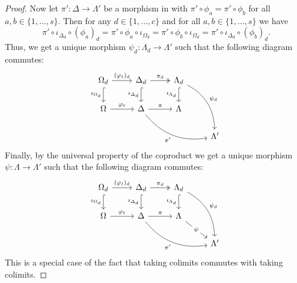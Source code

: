 \begin{proof}
Now let $\pi'\colon \Delta \to \Lambda'$ be a morphism in \SkeletalGSets{} with $\pi' \circ \phi_a = \pi' \circ \phi_b$ for all $a,b \in \{1,\dots,s\}$. Then for any $d \in \{1,\dots,c\}$ and for all $a,b \in \{1,\dots,s\}$ we have \[\pi' \circ \iota_{\Delta_d} \circ (\phi_a)_d = \pi' \circ \phi_a \circ \iota_{\Omega_d} = \pi' \circ \phi_b \circ \iota_{\Omega_d} = \pi' \circ \iota_{\Delta_d} \circ (\phi_b)_d.\] Thus, we get a unique morphism $\psi_d \colon \Lambda_d \to \Lambda'$ such that the following diagram commutes:
\[
\begin{tikzcd}
\Omega_d \arrow[d, "\iota_{\Omega_d}"', hook] \arrow[r, "(\phi_t)_d"] & \Delta_d \arrow[d, "\iota_{\Delta_d}"', hook] \arrow[r, "\pi_d", two heads] & \Lambda_d \arrow[d, "\iota_{\Lambda_d}"', hook] \arrow[rdd, "\psi_d", bend left] &          \\
\Omega \arrow[r, "\phi_t"]                                            & \Delta \arrow[r, "\pi"] \arrow[rrd, "\pi'"', bend right]                    & \Lambda                                                                          &          \\
                                                                      &                                                                             &                                                                                  & \Lambda'
\end{tikzcd}
\]
Finally, by the universal property of the coproduct we get a unique morphism $\psi \colon \Lambda \to \Lambda'$ such that the following diagram commutes:
\[
\begin{tikzcd}
\Omega_d \arrow[d, "\iota_{\Omega_d}"', hook] \arrow[r, "(\phi_t)_d"] & \Delta_d \arrow[d, "\iota_{\Delta_d}"', hook] \arrow[r, "\pi_d", two heads] & \Lambda_d \arrow[d, "\iota_{\Lambda_d}"', hook] \arrow[rdd, "\psi_d", bend left] &          \\
\Omega \arrow[r, "\phi_t"]                                            & \Delta \arrow[r, "\pi"] \arrow[rrd, "\pi'"', bend right]                    & \Lambda \arrow[rd, "\psi" description]                                           &          \\
                                                                      &                                                                             &                                                                                  & \Lambda'
\end{tikzcd}
\]
This is a special case of the fact that taking colimits commutes with taking colimits.


\end{proof}
